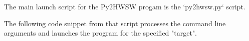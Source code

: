 %

The main launch script for the Py2HWSW progam is the `py2hwsw.py` script.

The following code snippet from that script processes the command line arguments and launches the program for the specified "target".



